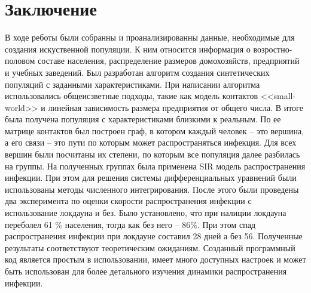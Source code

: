 \documentclass[14pt,a4paper]{article}
\begin{document}
\newpage
\section{Заключение}

В ходе реботы были собранны и проанализированны данные, необходимые для создания искуственной популяции. К ним относится информация о возростно-половом составе населения, распределение размеров домохозяйств, предприятий и учебных заведений. Был разработан алгоритм создания синтетических популяций с заданными характеристиками. При написании алгоритма использовались общеисзветные подходы, такие как модель контактов <<small-world>> и линейная зависимость размера предприятия от общего числа. В итоге была получена популяция с характеристиками близкими к реальным. По ее матрице контактов был построен граф, в котором каждый человек -- это вершина, а его связи -- это пути по которым может распространяться инфекция. Для всех вершин были посчитаны их степени, по которым все популяция далее разбилась на группы. На полученных группах была применена SIR модель распространения инфекции. При этом для решения системы дифференциальных уравнений были использованы методы численного интегрирования. После этого были проведены два эксперимента по оценки скорости распространения инфекции с использование локдауна и без. Было установлено, что при налиции локдауна переболел 61 \% населения, тогда как без него -- 86\%. При этом спад распространения инфекции при локдауне составил 28 дней а без 56. Полученные результаты соответствуют теоретическим ожиданиям. 
Созданный программный код является простым в использовании, имеет много доступных настроек и может быть использован для более детального изучения динамики распространения инфекции.
\end{document}
